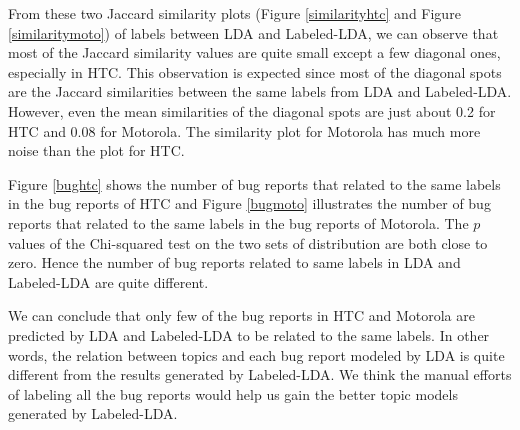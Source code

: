\documentclass[10pt, conference, compsocconf]{IEEEtran}
\begin{document}
From these two Jaccard similarity plots (Figure \ref{similarityhtc} and Figure \ref{similaritymoto}) of labels between LDA and Labeled-LDA, we can observe that most of the Jaccard similarity values are quite small except a few diagonal ones, especially in HTC. This observation is expected since most of the diagonal spots are the Jaccard similarities between the same labels from LDA and Labeled-LDA. However, even the mean similarities of the diagonal spots are just about 0.2 for HTC and 0.08 for Motorola. The similarity plot for Motorola has much more noise than the plot for HTC.  

Figure \ref{bughtc} shows the number of bug reports that related to the same labels in the bug reports of HTC and Figure \ref{bugmoto} illustrates the number of bug reports that related to the same labels in the bug reports of Motorola. The $ p $ values of the Chi-squared test on the two sets of distribution are both close to zero. Hence the number of bug reports related to same labels in LDA and Labeled-LDA are quite different.




We can conclude that only few of the bug reports in HTC and Motorola are predicted by LDA and Labeled-LDA to be related to the same labels. In other words, the relation between topics and each bug report modeled by LDA is quite different from the results generated by Labeled-LDA. We think the manual efforts of labeling all the bug reports would help us gain the better topic models generated by Labeled-LDA. 
\end{document}
